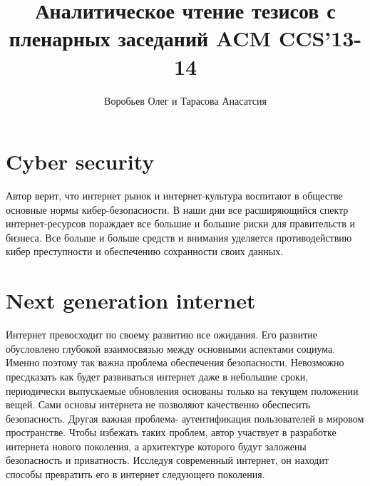 \documentclass[12pt,]{article}
\author{Воробьев Олег и Тарасова Анасатсия}
\title{Аналитическое чтение тезисов с пленарных заседаний ACM CCS'13-14}
\begin{document}
\maketitle
\section{Cyber security}
Автор верит, что интернет рынок и интернет-культура воспитают в обществе основные нормы кибер-безопасности.
В наши дни все расширяющийся спектр интернет-ресурсов пораждает все большие и большие риски для правительств и бизнеса.
Все больше и больше средств и внимания уделяется противодействию кибер преступности и обеспечению сохранности своих данных.
\section{Next generation internet}
Интернет превосходит по своему развитию все ожидания. Его развитие обусловлено глубокой взаимосвязью между основными аспектами социума. Именно поэтому так важна проблема обеспечения безопасности.
Невозможно пресдказать как будет развиваться интернет даже в небольшие сроки, периодически выпускаемые обновления основаны только на текущем положении вещей. Сами основы интернета не позволяют качественно обеспесить безопасность. Другая важная проблема- аутентификация пользователей в мировом пространстве. Чтобы избежать таких проблем, автор участвует в разработке интернета нового поколения, а архитектуре которого будут заложены безопасность и приватность. Исследуя современный интернет, он находит способы превратить его в интернет следующего поколения.
\end{document}
